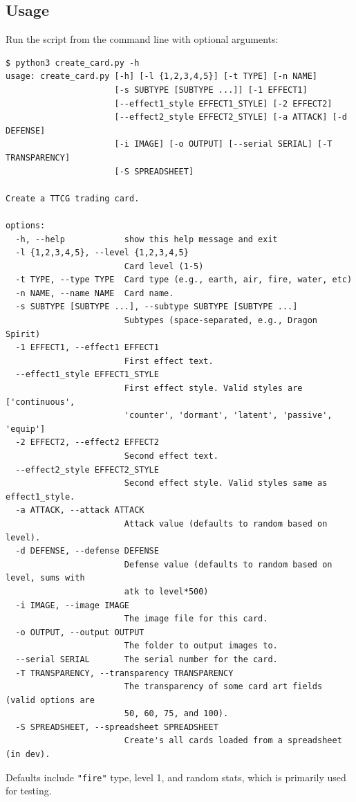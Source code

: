 \subsection{Usage}
Run the script from the command line with optional arguments:
\begin{lstlisting}[style=terminalstyle]
$ python3 create_card.py -h
usage: create_card.py [-h] [-l {1,2,3,4,5}] [-t TYPE] [-n NAME]
                      [-s SUBTYPE [SUBTYPE ...]] [-1 EFFECT1]
                      [--effect1_style EFFECT1_STYLE] [-2 EFFECT2]
                      [--effect2_style EFFECT2_STYLE] [-a ATTACK] [-d DEFENSE]
                      [-i IMAGE] [-o OUTPUT] [--serial SERIAL] [-T TRANSPARENCY]
                      [-S SPREADSHEET]

Create a TTCG trading card.

options:
  -h, --help            show this help message and exit
  -l {1,2,3,4,5}, --level {1,2,3,4,5}
                        Card level (1-5)
  -t TYPE, --type TYPE  Card type (e.g., earth, air, fire, water, etc)
  -n NAME, --name NAME  Card name.
  -s SUBTYPE [SUBTYPE ...], --subtype SUBTYPE [SUBTYPE ...]
                        Subtypes (space-separated, e.g., Dragon Spirit)
  -1 EFFECT1, --effect1 EFFECT1
                        First effect text.
  --effect1_style EFFECT1_STYLE
                        First effect style. Valid styles are ['continuous',
                        'counter', 'dormant', 'latent', 'passive', 'equip']
  -2 EFFECT2, --effect2 EFFECT2
                        Second effect text.
  --effect2_style EFFECT2_STYLE
                        Second effect style. Valid styles same as effect1_style.
  -a ATTACK, --attack ATTACK
                        Attack value (defaults to random based on level).
  -d DEFENSE, --defense DEFENSE
                        Defense value (defaults to random based on level, sums with
                        atk to level*500)
  -i IMAGE, --image IMAGE
                        The image file for this card.
  -o OUTPUT, --output OUTPUT
                        The folder to output images to.
  --serial SERIAL       The serial number for the card.
  -T TRANSPARENCY, --transparency TRANSPARENCY
                        The transparency of some card art fields (valid options are
                        50, 60, 75, and 100).
  -S SPREADSHEET, --spreadsheet SPREADSHEET
                        Create's all cards loaded from a spreadsheet (in dev).

\end{lstlisting}
Defaults include \texttt{"fire"} type, level 1, and random stats, which is primarily used for testing.


